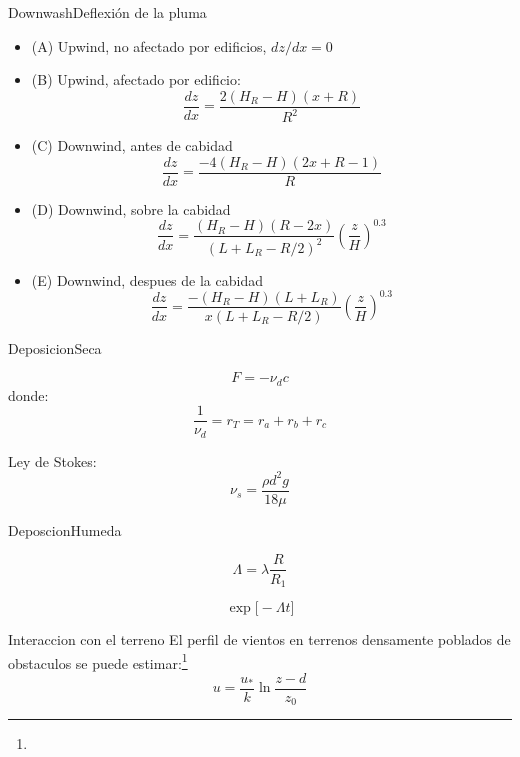 \begin{frame}{Downwash}{Deflexión de la pluma}
\begin{itemize}
    \item (A) Upwind, no afectado por edificios, $dz/dx=0$
    \item (B) Upwind, afectado por edificio:
    $$ \dfrac{dz}{dx}= \dfrac{2(H_R-H)(x+R)}{R^2}$$
    \item (C) Downwind, antes de cabidad
    $$ \dfrac{dz}{dx}= \dfrac{-4(H_R-H)(2x+R-1)}{R}$$

    \item (D) Downwind, sobre la cabidad
    $$ \dfrac{dz}{dx}= \dfrac{(H_R-H)(R-2x)}{(L+L_R - R/2)^2}(\dfrac{z}{H})^{0.3}$$

    \item (E)  Downwind, despues de la cabidad
    $$ \dfrac{dz}{dx}= \dfrac{-(H_R-H)(L+L_R)}{x(L+L_R - R/2)}(\dfrac{z}{H})^{0.3}$$

    

\end{itemize}{}

\end{frame}


\begin{frame}{Deposicion}{Seca}
    
    $$F = - \nu_d c $$
    donde:
    $$\dfrac{1}{\nu_d} = r_T = r_a + r_b + r_c $$
    
    
    Ley de Stokes:
    $$ \nu_s = \dfrac{\rho d^2 g}{18\mu}$$
\end{frame}


\begin{frame}{Deposcion}{Humeda}
    
    
    $$\Lambda = \lambda \dfrac{R}{R_1} $$
    
    
    $$\exp \bigg[ - \Lambda t \bigg] $$
\end{frame}


\begin{frame}{Interaccion con el terreno}
    El perfil de vientos en terrenos densamente poblados de obstaculos se puede estimar:\footnote{}
    $$ u = \frac{u_*}{k} \ln{}\dfrac{z-d}{z_0}$$
\end{frame}